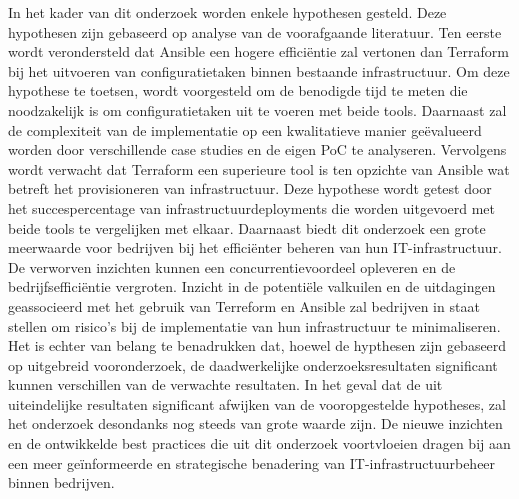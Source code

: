 In het kader van dit onderzoek worden enkele hypothesen gesteld. Deze hypothesen zijn gebaseerd op analyse van de voorafgaande literatuur.
Ten eerste wordt verondersteld dat Ansible een hogere efficiëntie zal vertonen dan Terraform bij het uitvoeren van configuratietaken binnen bestaande infrastructuur. Om deze hypothese te toetsen, wordt voorgesteld om de benodigde tijd te meten die noodzakelijk is om configuratietaken uit te voeren met beide tools. Daarnaast zal de complexiteit van de implementatie op een kwalitatieve manier geëvalueerd worden door verschillende case studies en de eigen PoC te analyseren.
Vervolgens wordt verwacht dat Terraform een superieure tool is ten opzichte van Ansible wat betreft het provisioneren van infrastructuur. Deze hypothese wordt getest door het succespercentage van infrastructuurdeployments die worden uitgevoerd met beide tools te vergelijken met elkaar.
Daarnaast biedt dit onderzoek een grote meerwaarde voor bedrijven bij het efficiënter beheren van hun IT-infrastructuur. De verworven inzichten kunnen een concurrentievoordeel opleveren en de bedrijfsefficiëntie vergroten. Inzicht in de potentiële valkuilen en de uitdagingen geassocieerd met het gebruik van Terreform en Ansible zal bedrijven in staat stellen om risico’s bij de implementatie van hun infrastructuur te minimaliseren.
Het is echter van belang te benadrukken dat, hoewel de hypthesen zijn gebaseerd op uitgebreid vooronderzoek, de daadwerkelijke onderzoeksresultaten significant kunnen verschillen van de verwachte resultaten. In het geval dat de uit uiteindelijke resultaten significant afwijken van de vooropgestelde hypotheses, zal het onderzoek desondanks nog steeds van grote waarde zijn. De nieuwe inzichten en de ontwikkelde best practices die uit dit onderzoek voortvloeien dragen bij aan een meer geïnformeerde en strategische benadering van IT-infrastructuurbeheer binnen bedrijven.

